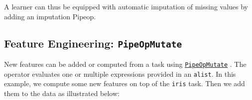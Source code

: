 \documentclass[]{scrbook}
\newenvironment{Shaded}{\begin{snugshade}}{\end{snugshade}}
\newcommand{\DataTypeTok}[1]{\textcolor[rgb]{0.13,0.29,0.53}{#1}}
\newcommand{\KeywordTok}[1]{\textcolor[rgb]{0.13,0.29,0.53}{\textbf{#1}}}
\newcommand{\NormalTok}[1]{#1}
\newcommand{\OperatorTok}[1]{\textcolor[rgb]{0.81,0.36,0.00}{\textbf{#1}}}
\newcommand{\StringTok}[1]{\textcolor[rgb]{0.31,0.60,0.02}{#1}}
\renewenvironment{Shaded} {\begin{snugshade}\small} {\end{snugshade}}
\begin{document}
\begin{Shaded}
\end{Shaded}

A learner can thus be equipped with automatic imputation of missing values by adding an imputation Pipeop.

\begin{Shaded}
\end{Shaded}

\hypertarget{feature-engineering-pipeopmutate}{%
\subsection{\texorpdfstring{Feature Engineering: \texttt{PipeOpMutate}}{Feature Engineering: PipeOpMutate}}\label{feature-engineering-pipeopmutate}}

New features can be added or computed from a task using \href{https://mlr3pipelines.mlr-org.com/reference/mlr_pipeops_mutate.html}{\texttt{PipeOpMutate}} .
The operator evaluates one or multiple expressions provided in an \texttt{alist}.
In this example, we compute some new features on top of the \texttt{iris} task.
Then we add them to the data as illustrated below:
\end{document}
